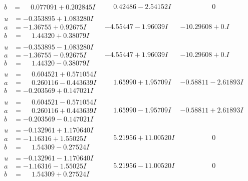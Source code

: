 \documentclass[1p]{elsarticle_modified}
\theoremstyle{definition}
\begin{document}
$$\begin{array}{c|c|c}
\begin{aligned}
b &= \phantom{-}0.077091 + 0.202845 I\end{aligned}
 & \phantom{-}0.42486 - 2.54152 I & \phantom{-0.000000 } 0 \\ \hline\begin{aligned}
u &= -0.353895 + 1.083280 I \\
a &= -1.36755 + 0.92675 I \\
b &= \phantom{-}1.44320 + 0.38079 I\end{aligned}
 & -4.55447 - 1.96039 I & -10.29608 + 0. I\phantom{ +0.000000I} \\ \hline\begin{aligned}
u &= -0.353895 - 1.083280 I \\
a &= -1.36755 - 0.92675 I \\
b &= \phantom{-}1.44320 - 0.38079 I\end{aligned}
 & -4.55447 + 1.96039 I & -10.29608 + 0. I\phantom{ +0.000000I} \\ \hline\begin{aligned}
u &= \phantom{-}0.604521 + 0.571054 I \\
a &= \phantom{-}0.260116 - 0.443639 I \\
b &= -0.203569 + 0.147021 I\end{aligned}
 & \phantom{-}1.65990 + 1.95709 I & -0.58811 - 2.61893 I \\ \hline\begin{aligned}
u &= \phantom{-}0.604521 - 0.571054 I \\
a &= \phantom{-}0.260116 + 0.443639 I \\
b &= -0.203569 - 0.147021 I\end{aligned}
 & \phantom{-}1.65990 - 1.95709 I & -0.58811 + 2.61893 I \\ \hline\begin{aligned}
u &= -0.132961 + 1.170640 I \\
a &= -1.16316 + 1.55025 I \\
b &= \phantom{-}1.54309 - 0.27524 I\end{aligned}
 & \phantom{-}5.21956 + 11.00520 I & \phantom{-0.000000 } 0 \\ \hline\begin{aligned}
u &= -0.132961 - 1.170640 I \\
a &= -1.16316 - 1.55025 I \\
b &= \phantom{-}1.54309 + 0.27524 I\end{aligned}
 & \phantom{-}5.21956 - 11.00520 I & \phantom{-0.000000 } 0 \\ \hline\begin{aligned}

\end{aligned}
\end{array}$$
\end{document}
